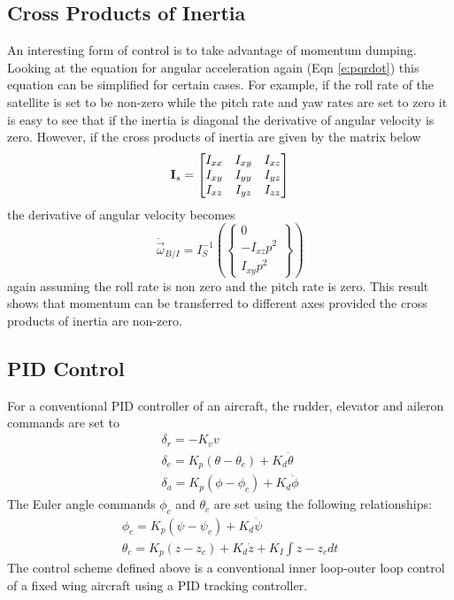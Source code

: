 \documentclass{article}
\begin{document}
\subsection{Cross Products of Inertia}

An interesting form of control is to take advantage of momentum
dumping. Looking at the equation for angular acceleration again (Eqn \ref{e:pqrdot}) this
equation can be simplified for certain cases. For example, if the roll
rate of the satellite is set to be non-zero while the pitch rate and
yaw rates are set to zero it is easy to see that if the inertia is
diagonal the derivative of angular velocity is zero. However, if the
cross products of inertia are given by the matrix below
\begin{equation}
  {\bf I}_s = \begin{bmatrix} I_{xx} & I_{xy} & I_{xz} \\ I_{xy} &
    I_{yy} & I_{yz} \\ I_{xz} & I_{yz} & I_{zz} \end{bmatrix}
\end{equation}
the derivative of angular velocity becomes
\begin{equation}
  \dot{\vec{\omega}}_{B/I} = I_S^{-1} \left (\begin{Bmatrix} 0
    \\ -I_{xz}p^2 \\ I_{xy}p^2 \end{Bmatrix} \right )
\end{equation}
again assuming the roll rate is non zero and the pitch rate is
zero. This result shows that momentum can be transferred to different
axes provided the cross products of inertia are non-zero.

\subsection{PID Control}

For a conventional PID controller of an aircraft, the rudder, elevator
and aileron commands are set to 
\begin{equation}
\begin{matrix}
\delta_{r} =-K_v v \\
\delta_{e} = K_p(\theta-\theta_{c})+K_d{\dot \theta} \\ 
\delta_a = K_p(\phi-\phi_{c})+K_d{\dot \phi}
\end{matrix}
\end{equation}
The Euler angle commands $\phi_{c}$ and $\theta_{c}$ are set using the
following relationships:
\begin{equation}
  \begin{matrix}
  \phi_{c} = K_p(\psi-\psi_c)+K_d\dot{\psi} \\
  \theta_{c} = K_p(z-z_c) + K_d\dot{z} + K_{I}\int{z-z_c}dt
  \end{matrix}
\end{equation}
The control scheme defined above is a conventional inner loop-outer
loop control of a fixed wing aircraft using a PID tracking
controller.
\end{document}
